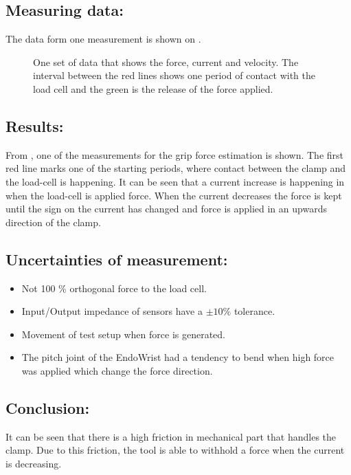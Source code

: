 \subsection*{Measuring data:}
The data form one measurement is shown on .
\begin{figure}[H]
\centering

\caption{One set of data that shows the force, current and velocity. The interval between the red lines shows one period of contact with the load cell and the green is the release of the force applied.}
\label{yaw_mes123}
\end{figure}




\subsection*{Results:}
From , one of the measurements for the grip force estimation is shown. The first red line marks one of the starting periods, where contact between the clamp and the load-cell is happening. It can be seen that a current increase is happening in when the load-cell is applied force. When the current decreases the force is kept until the sign on the current has changed and force is applied in an upwards direction of the clamp. 




%

\subsection*{Uncertainties of measurement:}
\begin{itemize}
\item Not 100 \% orthogonal force to the load cell.
\item Input/Output impedance of sensors have a $\pm 10 \%$ tolerance.
\item Movement of test setup when force is generated.
\item The pitch joint of the EndoWrist had a tendency to bend when high force was applied which change the force direction. 
\end{itemize}

\subsection*{Conclusion:}
It can be seen that there is a high friction in mechanical part that handles the clamp. Due to this friction, the tool is able to withhold a force when the current is decreasing.